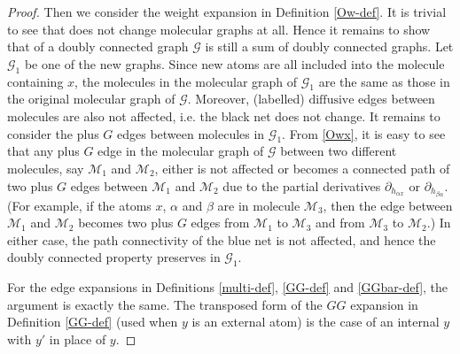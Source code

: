 \documentclass{article}
\newcommand{\1}{\mathds{1}}
\numberwithin{equation}{section}
\newcommand{\al}{\alpha}
\renewcommand{\cal}{\mathcal}
\newcommand{\dashed}{\text{diffusive}}
\theoremstyle{plain} %
\theoremstyle{remark}
\newcommand{\cor}{\color{red}}
\begin{document}
\begin{proof}
Then we consider the weight expansion in Definition \ref{Ow-def}. It is trivial to see that \smash{${\cal O}^{(x),1}_{weight}$} does not change molecular graphs at all. Hence it remains to show that \smash{${\cal O}^{(x),2}_{weight}[\cal G]$} of a doubly connected graph $\cal G$ is still a sum of doubly connected graphs. Let $\cal G_1$ be one of the new graphs. Since new atoms are all included into the molecule containing $x$, the molecules in the molecular graph of $\cal G_1$ are the same as those in the original molecular graph of $\cal G$. Moreover, (labelled) $\dashed$ edges between molecules are also not affected, i.e. the black net does not change. It remains to consider the plus $G$ edges between molecules in $\cal G_1$. From \eqref{Owx}, it is easy to see that any plus $G$ edge in the molecular graph of $\cal G$ between two different molecules, say $\cal M_1$ and $\cal M_2$, either is not affected or becomes a connected path of two plus $G$ edges between $\cal M_1$ and $\cal M_2$ due to the partial derivatives $\partial_{h_{ \al x}}$ or $\partial_{h_{\beta\al}}$. (For example, if the atoms $x$, $\al$ and $\beta$ are in molecule $\cal M_3$, then the edge between $\cal M_1$ and $\cal M_2$ becomes two plus $G$ edges from $\cal M_1$ to $\cal M_3$ and from $\cal M_3$ to $\cal M_2$.) In either case, the path connectivity of the blue net is not affected, and hence the doubly connected property preserves in $\cal G_1$.


For the edge expansions in Definitions \ref{multi-def}, \ref{GG-def} and \ref{GGbar-def}, the argument is exactly the same. The transposed form of the $GG$ expansion in Definition \ref{GG-def} (used when $y$ is an external atom) is the case of an internal $y$ with $y'$ in place of $y$.
 \end{proof}
\end{document}
